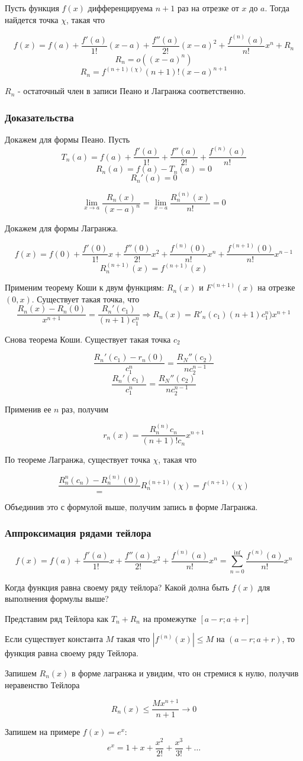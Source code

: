\documentclass{article}
\begin{document}
Пусть функция $f(x)$ дифференцируема $n+1$ раз на отрезке от $x$ до $a$. Тогда найдется точка $\chi$, такая что 

$$f(x) = f(a) + \frac{f'(a)}{1!}(x-a) + \frac{f''(a)}{2!}(x-a)^2 + \frac{f^(n)(a)}{n!}x^n + R_n$$
$$R_n = o((x-a)^n)$$
$$R_n = f^{(n+1)(\chi)}{(n+1)!}(x-a)^{n+1}$$

$R_n$ - остаточный член в записи Пеано и Лагранжа соответственно.
\subsubsection*{Доказательства}

Докажем для формы Пеано. Пусть 
$$T_n(a) = f(a) + \frac{f'(a)}{1!} + \frac{f''(a)}{2!} + \frac{f^(n)(a)}{n!}$$
$$R_n(a) = f(a) - T_n(a) = 0$$
$$R_n'(a) = 0$$

$$\lim_{x \to a} \frac{R_n(x)}{(x-a)^n} = \lim_{x-a}\frac{R_n^{(n)}(x)}{n!} = 0$$

Докажем для формы Лагранжа.

$$f(x) = f(0) + \frac{f'(0)}{1!}x + \frac{f''(0)}{2!}x^2 + \frac{f^{(n)}(0)}{n!}x^n + \frac{f^{(n+1)}(0)}{n!}x^{n-1}$$
$$R_n^{(n+1)}(x) = f^{(n+1)}(x)$$

Применим теорему Коши к двум функциям: $R_n(x)$ и $F^{(n+1)}(x)$ на отрезке $(0,x)$. Существует такая точка, что 
$$\frac{R_n(x) - R_n(0)}{x^{n+1}} = \frac{R_n'(c_1)}{(n+1)c_1^n} \Rightarrow R_n(x) = R'_n(c_1){(n+1)c_1^n)}x^{n+1}$$

Снова теорема Коши. Существует такая точка $c_2$

$$\frac{R_n'(c_1) - r_n(0)}{c_1^n} = \frac{R_N''(c_2)}{nc_2^{n-1}}$$
$$\frac{R_n'(c_1)}{c_1^n} = \frac{R_N''(c_2)}{nc_2^{n-1}}$$

Применив ее $n$ раз, получим

$$r_n(x) = \frac{R_n^{(n)}c_n}{(n+1)!c_n}x^{n+1}$$

По теореме Лагранжа, существует точка $\chi$, такая что

$$\frac{R_n^{n}(c_n) - R_n^{(n)}(0)} = R_n^{(n+1)}(\chi) = f^{(n+1)}(\chi)$$

Объединив это с формулой выше, получим запись в форме Лагранжа.

\subsubsection*{Аппроксимация рядами тейлора}

$$f(x) = f(a) + \frac{f'(a)}{1!}x + \frac{f''(a)}{2!}x^2 + \frac{f^{(n)}(a)}{n!}x^n = \sum_{n=0}^{\inf} \frac{f^{(n)}(a)}{n!}x^n$$

Когда функция равна своему ряду тейлора? Какой долна быть $f(x)$ для выполнения формулы выше?

Представим ряд Тейлора как $T_n+R_n$ на промежутке $[a-r;a+r]$

Если существует константа $M$ такая что $|f^{(n)}(x)| \le M$ на $(a-r;a+r)$, то функция равна своему ряду Тейлора.

Запишем $R_n(x)$ в форме лагранжа и увидим, что он стремися к нулю, получив неравенство Тейлора

$$R_n(x) \le \frac{M x^{n+1}}{n+1} \to 0$$


Запишем на примере $f(x) = e^x$:
$$e^x = 1 + x + \frac{x^2}{2!} + \frac{x^3}{3!} + \ldots$$
\end{document}
